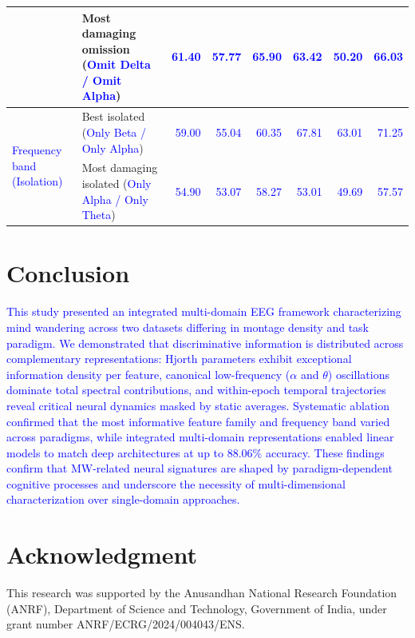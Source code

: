 \documentclass[conference]{IEEEtran}
\begin{document}
\begin{table}[h]
{\begin{tabular}{llrrr|rrr}
& Most damaging omission (\textcolor{blue}{Omit Delta / Omit Alpha})
& \textcolor{blue}{61.40} & \textcolor{blue}{57.77} & \textcolor{blue}{65.90}
& \textcolor{blue}{63.42} & \textcolor{blue}{50.20} & \textcolor{blue}{66.03} \\
\midrule
\multirow{2}{*}{\textcolor{blue}{Frequency band (Isolation)}}
& Best isolated (\textcolor{blue}{Only Beta / Only Alpha})
& \textcolor{blue}{59.00} & \textcolor{blue}{55.04} & \textcolor{blue}{60.35}
& \textcolor{blue}{67.81} & \textcolor{blue}{63.01} & \textcolor{blue}{71.25} \\
& Most damaging isolated (\textcolor{blue}{Only Alpha / Only Theta})
& \textcolor{blue}{54.90} & \textcolor{blue}{53.07} & \textcolor{blue}{58.27}
& \textcolor{blue}{53.01} & \textcolor{blue}{49.69} & \textcolor{blue}{57.57} \\
\bottomrule
\end{tabular}%
}
\end{table}

\section{Conclusion}

\textcolor{blue}{This study presented an integrated multi-domain EEG framework characterizing mind wandering across two datasets differing in montage density and task paradigm. We demonstrated that discriminative information is distributed across complementary representations: Hjorth parameters exhibit exceptional information density per feature, canonical low-frequency ($\alpha$ and $\theta$) oscillations dominate total spectral contributions, and within-epoch temporal trajectories reveal critical neural dynamics masked by static averages. Systematic ablation confirmed that the most informative feature family and frequency band varied across paradigms, while integrated multi-domain representations enabled linear models to match deep architectures at up to 88.06\% accuracy. These findings confirm that MW-related neural signatures are shaped by paradigm-dependent cognitive processes and underscore the necessity of multi-dimensional characterization over single-domain approaches.}

\section*{Acknowledgment}
This research was supported by the Anusandhan National Research Foundation (ANRF), Department of Science and Technology, Government of India, under grant number ANRF/ECRG/2024/004043/ENS.



\end{document}
